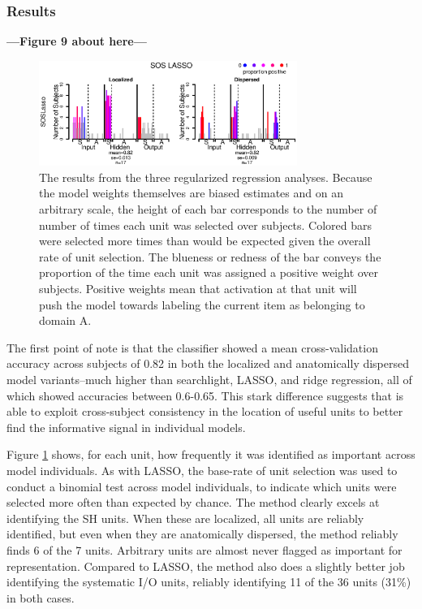 \subsubsection{Results}
\textbf{---Figure 9 about here---}
\begin{figure}
\centering
\includegraphics[width=0.75\textwidth]{figures/soslasso_only.eps}
\caption{\label{fig.sos} The results from the three regularized regression analyses. Because the model weights themselves are biased estimates and on an arbitrary scale, the height of each bar corresponds to the number of number of times each unit was selected over subjects. Colored bars were selected more times than would be expected given the overall rate of unit selection. The blueness or redness of the bar conveys the proportion of the time each unit was assigned a positive weight over subjects. Positive weights mean that activation at that unit will push the model towards labeling the current item as belonging to domain A.}
\end{figure}

The first point of note is that the \soslasso classifier showed a mean cross-validation accuracy across subjects of 0.82 in both the localized and anatomically dispersed model variants--much higher than searchlight, LASSO, and ridge regression, all of which showed accuracies between 0.6-0.65. This stark difference suggests that \soslasso is able to exploit cross-subject consistency in the location of useful units to better find the informative signal in individual models.

Figure \ref{fig.sos} shows, for each unit, how frequently it was identified as important across model individuals. As with LASSO, the base-rate of unit selection was used to conduct a binomial test across model individuals, to indicate which units were selected more often than expected by chance. The method clearly excels at identifying the SH units. When these are localized, all units are reliably identified, but even when they are anatomically dispersed, the method reliably finds 6 of the 7 units. Arbitrary units are almost never flagged as important for representation. Compared to LASSO, the method also does a slightly better job identifying the systematic I/O units, reliably identifying 11 of the 36 units (31\%) in both cases.

